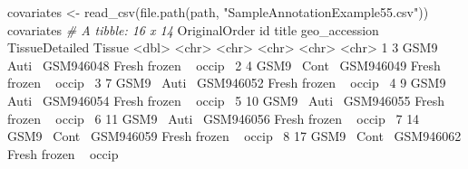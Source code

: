 \documentclass[]{article}
\newcommand{\hlnum}[1]{\textcolor[rgb]{0.816,0.125,0.439}{#1}}%
\newcommand{\hlstr}[1]{\textcolor[rgb]{0.251,0.627,0.251}{#1}}%
\newcommand{\hlcom}[1]{\textcolor[rgb]{0.502,0.502,0.502}{\textit{#1}}}%
\newcommand{\hlopt}[1]{\textcolor[rgb]{0,0,0}{#1}}%
\newcommand{\hlstd}[1]{\textcolor[rgb]{0.251,0.251,0.251}{#1}}%
\newcommand{\hlkwd}[1]{\textcolor[rgb]{0.878,0.439,0.125}{#1}}%
\newenvironment{Shaded}{\begin{myshaded}}{\end{myshaded}}
\newcommand{\KeywordTok}[1]{\hlkwd{#1}}
\newcommand{\DecValTok}[1]{\hlnum{#1}}
\newcommand{\StringTok}[1]{\hlstr{#1}}
\newcommand{\CommentTok}[1]{\hlcom{#1}}
\newcommand{\OperatorTok}[1]{\hlopt{#1}}
\newcommand{\ErrorTok}[1]{\textcolor{errorcolor}{#1}}
\newcommand{\NormalTok}[1]{\hlstd{#1}}
\begin{document}
\begin{Shaded}
\begin{Highlighting}[]
\NormalTok{covariates <-}\StringTok{ }\KeywordTok{read_csv}\NormalTok{(}\KeywordTok{file.path}\NormalTok{(path, }
                                 \StringTok{"SampleAnnotationExample55.csv"}\NormalTok{))}
\NormalTok{covariates}
  \CommentTok{# A tibble: 16 x 14}
\NormalTok{     OriginalOrder id    title geo_accession TissueDetailed Tissue}
             \OperatorTok{<}\NormalTok{dbl}\OperatorTok{>}\StringTok{ }\ErrorTok{<}\NormalTok{chr}\OperatorTok{>}\StringTok{ }\ErrorTok{<}\NormalTok{chr}\OperatorTok{>}\StringTok{ }\ErrorTok{<}\NormalTok{chr}\OperatorTok{>}\StringTok{         }\ErrorTok{<}\NormalTok{chr}\OperatorTok{>}\StringTok{          }\ErrorTok{<}\NormalTok{chr}\OperatorTok{>}\StringTok{ }
\StringTok{   }\DecValTok{1}             \DecValTok{3}\NormalTok{ GSM9}\OperatorTok{~}\StringTok{ }\NormalTok{Auti}\OperatorTok{~}\StringTok{ }\NormalTok{GSM946048     Fresh frozen }\OperatorTok{~}\StringTok{ }\NormalTok{occip}\OperatorTok{~}
\StringTok{   }\DecValTok{2}             \DecValTok{4}\NormalTok{ GSM9}\OperatorTok{~}\StringTok{ }\NormalTok{Cont}\OperatorTok{~}\StringTok{ }\NormalTok{GSM946049     Fresh frozen }\OperatorTok{~}\StringTok{ }\NormalTok{occip}\OperatorTok{~}
\StringTok{   }\DecValTok{3}             \DecValTok{7}\NormalTok{ GSM9}\OperatorTok{~}\StringTok{ }\NormalTok{Auti}\OperatorTok{~}\StringTok{ }\NormalTok{GSM946052     Fresh frozen }\OperatorTok{~}\StringTok{ }\NormalTok{occip}\OperatorTok{~}
\StringTok{   }\DecValTok{4}             \DecValTok{9}\NormalTok{ GSM9}\OperatorTok{~}\StringTok{ }\NormalTok{Auti}\OperatorTok{~}\StringTok{ }\NormalTok{GSM946054     Fresh frozen }\OperatorTok{~}\StringTok{ }\NormalTok{occip}\OperatorTok{~}
\StringTok{   }\DecValTok{5}            \DecValTok{10}\NormalTok{ GSM9}\OperatorTok{~}\StringTok{ }\NormalTok{Auti}\OperatorTok{~}\StringTok{ }\NormalTok{GSM946055     Fresh frozen }\OperatorTok{~}\StringTok{ }\NormalTok{occip}\OperatorTok{~}
\StringTok{   }\DecValTok{6}            \DecValTok{11}\NormalTok{ GSM9}\OperatorTok{~}\StringTok{ }\NormalTok{Auti}\OperatorTok{~}\StringTok{ }\NormalTok{GSM946056     Fresh frozen }\OperatorTok{~}\StringTok{ }\NormalTok{occip}\OperatorTok{~}
\StringTok{   }\DecValTok{7}            \DecValTok{14}\NormalTok{ GSM9}\OperatorTok{~}\StringTok{ }\NormalTok{Cont}\OperatorTok{~}\StringTok{ }\NormalTok{GSM946059     Fresh frozen }\OperatorTok{~}\StringTok{ }\NormalTok{occip}\OperatorTok{~}
\StringTok{   }\DecValTok{8}            \DecValTok{17}\NormalTok{ GSM9}\OperatorTok{~}\StringTok{ }\NormalTok{Cont}\OperatorTok{~}\StringTok{ }\NormalTok{GSM946062     Fresh frozen }\OperatorTok{~}\StringTok{ }\NormalTok{occip}\OperatorTok{~}

\end{Highlighting}
\end{Shaded}
\end{document}

